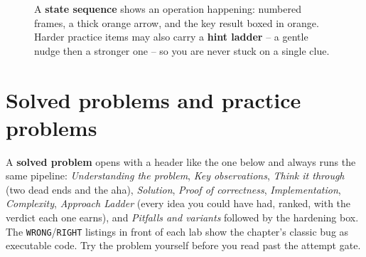 

\begin{figure}[H]
\centering
{}
\caption*{A \textbf{state sequence} shows an operation happening: numbered frames, a
thick orange arrow, and the key result boxed in orange. Harder practice items may also
carry a \textbf{hint ladder} -- a gentle nudge then a stronger one -- so you are never
stuck on a single clue.}
\end{figure}

\section*{Solved problems and practice problems}

A \textbf{solved problem} opens with a header like the one below and always
runs the same pipeline: \emph{Understanding the problem}, \emph{Key
observations}, \emph{Think it through} (two dead ends and the aha),
\emph{Solution}, \emph{Proof of correctness}, \emph{Implementation},
\emph{Complexity}, \emph{Approach Ladder} (every idea you could have had,
ranked, with the verdict each one earns), and \emph{Pitfalls and variants}
followed by the hardening box. The \texttt{WRONG}/\texttt{RIGHT} listings in
front of each lab show the chapter's classic bug as executable code.
Try the problem yourself before you read past the attempt gate.

